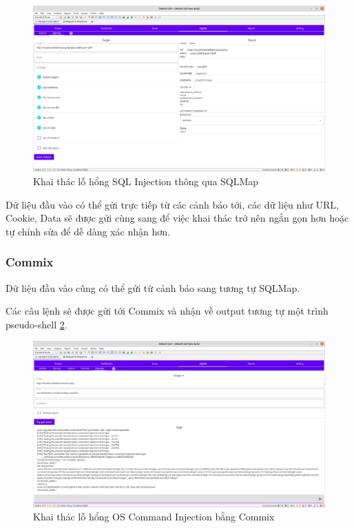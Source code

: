 \documentclass[./../main.tex]{subfiles}
\begin{document}
\begin{figure}[h!]
	\includegraphics[width=\linewidth]{./images/sqlmap_explot.png}
	\caption{Khai thác lỗ hổng SQL Injection thông qua SQLMap}
	\label{fig:sqlmap_explot}
\end{figure}
Dữ liệu đầu vào có thể gửi trực tiếp từ các cảnh báo tới, các dữ
liệu như URL, Cookie, Data sẽ được gửi cùng sang để việc khai thác
trở nên ngắn gọn hơn hoặc tự chỉnh sửa để dễ dàng xác nhận hơn.
\subsubsection{Commix}

Dữ liệu đầu vào cũng có thể gửi từ cảnh báo sang tương tự SQLMap.

Các câu lệnh sẽ được gửi tới Commix và nhận về output tương tự một
trình pseudo-shell \ref{fig:commix_exploit}.

\begin{figure}[h!]
	\includegraphics[width=\linewidth]{./images/commix_exploit.png}
	\caption{Khai thác lỗ hổng OS Command Injection bằng Commix	}
	\label{fig:commix_exploit}
\end{figure}
\end{document}
